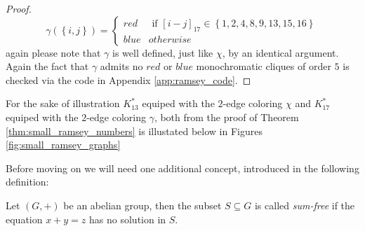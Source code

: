 \begin{proof}
	\begin{equation*}
		\gamma(\left\{i, j\right\}) = \begin{cases}
			red  & \text{ if } [i -  j]_{17} \in \left\{1, 2, 4, 8, 9, 13, 15, 16\right\} \\
			blue & otherwise
		\end{cases}
	\end{equation*}
	again please note that $\gamma$ is well defined, just like $\chi$, by an identical argument. Again the fact that $\gamma$ admits no $red$ or $blue$ monochromatic cliques of order $5$ is checked via the code in Appendix \ref{app:ramsey_code}.
\end{proof}

For the sake of illustration $K^{*}_{13}$ equiped with the $2$-edge coloring $\chi$ and $K^{*}_{17}$ equiped with the $2$-edge coloring $\gamma$, both from the proof of Theorem \ref{thm:small_ramsey_numbers} is illustated below in Figures \ref{fig:small_ramsey_graphs}


Before moving on we will need one additional concept, introduced in the following definition:
\begin{definition}\label{def:set_sum_free}
	Let $(G, +)$ be an abelian group, then the subset $S \subseteq G$ is called \textit{sum-free} if the equation $x + y = z$ has no solution in $S$.
\end{definition}

